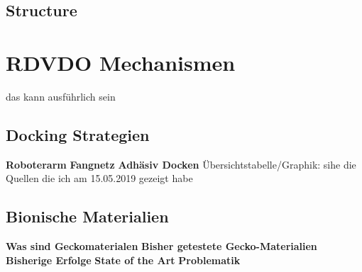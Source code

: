 		\subsection{Structure}
		
	\section{RDVDO Mechanismen} das kann ausführlich sein
		\subsection{Docking Strategien}
						\textbf{Roboterarm}
						\textbf{Fangnetz}
						\textbf{Adhäsiv Docken}
						Übersichtstabelle/Graphik: sihe die Quellen die ich am 15.05.2019 gezeigt habe
		\subsection{Bionische Materialien}
						\textbf{Was sind Geckomaterialen}
						\textbf{Bisher getestete Gecko-Materialien}
						\textbf{Bisherige Erfolge}
						\textbf{State of the Art}
						\textbf{Problematik}